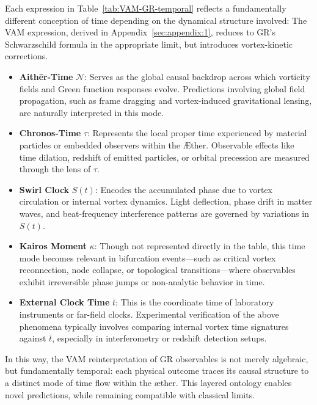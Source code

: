 Each expression in Table~\ref{tab:VAM-GR-temporal} reflects a fundamentally different conception of time depending on the dynamical structure involved:
The VAM expression, derived in Appendix~\ref{sec:appendix:1}, reduces to GR’s Schwarzschild formula in the appropriate limit, but introduces vortex-kinetic corrections.\\

\begin{itemize}
    \item \textbf{Aithēr-Time} \( \mathcal{N} \): Serves as the global causal backdrop across which vorticity fields and Green function responses evolve. Predictions involving global field propagation, such as frame dragging and vortex-induced gravitational lensing, are naturally interpreted in this mode.

    \item \textbf{Chronos-Time} \( \tau \): Represents the local proper time experienced by material particles or embedded observers within the Æther. Observable effects like time dilation, redshift of emitted particles, or orbital precession are measured through the lens of \( \tau \).

    \item \textbf{Swirl Clock} \( S(t) \): Encodes the accumulated phase due to vortex circulation or internal vortex dynamics. Light deflection, phase drift in matter waves, and beat-frequency interference patterns are governed by variations in \( S(t) \).

    \item \textbf{Kairos Moment} \( \kappa \): Though not represented directly in the table, this time mode becomes relevant in bifurcation events—such as critical vortex reconnection, node collapse, or topological transitions—where observables exhibit irreversible phase jumps or non-analytic behavior in time.

    \item \textbf{External Clock Time} \( \bar{t} \): This is the coordinate time of laboratory instruments or far-field clocks. Experimental verification of the above phenomena typically involves comparing internal vortex time signatures against \( \bar{t} \), especially in interferometry or redshift detection setups.
\end{itemize}

\noindent
In this way, the VAM reinterpretation of GR observables is not merely algebraic, but fundamentally temporal: each physical outcome traces its causal structure to a distinct mode of time flow within the \ae ther. This layered ontology enables novel predictions, while remaining compatible with classical limits.
